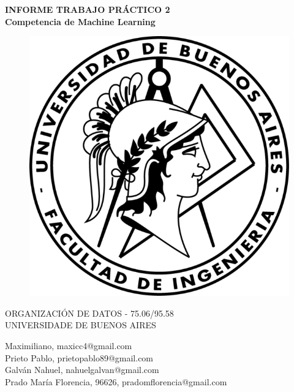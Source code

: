 \documentclass{tcc}
\begin{document}
\pagestyle{empty} %


\begin{center}
\LARGE{\bf INFORME TRABAJO PRÁCTICO 2}\\
\Large{\bf Competencia de Machine Learning}\\
\end{center}



\begin{figure}[H]
\centering
\includegraphics{imagenes/fiuba.png}
\end{figure}

\begin{center}
ORGANIZACIÓN DE DATOS - 75.06/95.58 \\
UNIVERSIDADE DE BUENOS AIRES

\end{center}

\vspace{1in}

\vspace{3em}

\begin{center}
Maximiliano, maxicc4@gmail.com\\
Prieto Pablo, prietopablo89@gmail.com\\
Galván Nahuel, nahuelgalvan@gmail.com\\
Prado María Florencia, 96626, pradomflorencia@gmail.com
\end{center}
\end{document}
